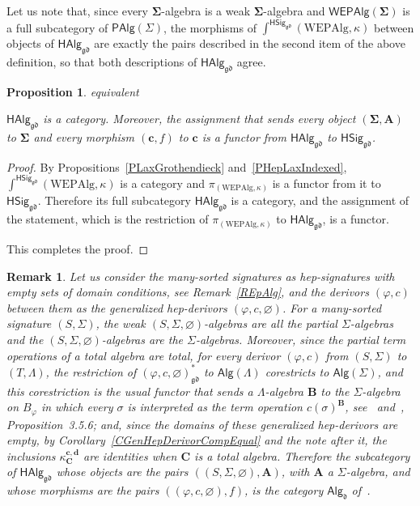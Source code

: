 \documentclass[a4paper, reqno]{amsbook}
\makeatletter
\newcommand{\sig}[1]{\mathbf{#1}}             %
\newcommand{\gd}{\mathfrak{gd}}              %
\theoremstyle{plain}
\newtheorem{proposition}[theorem]{Proposition}
\newtheorem{remark}[theorem]{Remark}
\theoremstyle{definition}
\newcommand*{\CA@leanpending}{}
\newcommand*{\CA@leanrelation}{}
\newcommand*{\lean}[2]{%
  \ifcsname\string\color@lean@#1\endcsname\else
    \PackageError{main}{Unknown relation `#1' in \string\lean}{Use equivalent, weaker or stronger.}%
  \fi
  \gdef\CA@leanrelation{#1}%
  \gdef\CA@leanpending{#2}}
\makeatother
\begin{document}
Let us note that, since every $\sig{\Sigma}$-algebra is a weak $\sig{\Sigma}$-algebra and $\mathsf{WEPAlg}(\sig{\Sigma})$ is a full subcategory of $\mathsf{PAlg}(\Sigma)$, the morphisms of $\int^{\mathsf{HSig}_{\gd}}(\mathrm{WEPAlg},\kappa)$ between objects of $\mathsf{HAlg}_{\gd}$ are exactly the pairs described in the second item of the above definition, so that both descriptions of $\mathsf{HAlg}_{\gd}$ agree.

\begin{proposition}\label{PHepAlgCat}\lean{equivalent}{HepAlgebra.projection}
$\mathsf{HAlg}_{\gd}$ is a category.
Moreover, the assignment that sends every object $(\sig{\Sigma},\mathbf{A})$ to $\sig{\Sigma}$ and every morphism $(\mathbf{c},f)$ to $\mathbf{c}$ is a functor from $\mathsf{HAlg}_{\gd}$ to $\mathsf{HSig}_{\gd}$.
\end{proposition}
\begin{proof}
By Propositions~\ref{PLaxGrothendieck} and~\ref{PHepLaxIndexed}, $\int^{\mathsf{HSig}_{\gd}}(\mathrm{WEPAlg},\kappa)$ is a category and $\pi_{(\mathrm{WEPAlg},\kappa)}$ is a functor from it to $\mathsf{HSig}_{\gd}$.
Therefore its full subcategory $\mathsf{HAlg}_{\gd}$ is a category, and the assignment of the statement, which is the restriction of $\pi_{(\mathrm{WEPAlg},\kappa)}$ to $\mathsf{HAlg}_{\gd}$, is a functor.

This completes the proof.
\end{proof}

\begin{remark}\label{RHepAlgCat}
Let us consider the many-sorted signatures as hep-signatures with empty sets of domain conditions, see Remark~\ref{REpAlg}, and the derivors $(\varphi,c)$ between them as the generalized hep-derivors $(\varphi,c,\varnothing)$.
For a many-sorted signature $(S,\Sigma)$, the weak $(S,\Sigma,\varnothing)$-algebras are all the partial $\Sigma$-algebras and the $(S,\Sigma,\varnothing)$-algebras are the $\Sigma$-algebras.
Moreover, since the partial term operations of a total algebra are total, for every derivor $(\varphi,c)$ from $(S,\Sigma)$ to $(T,\Lambda)$, the restriction of $(\varphi,c,\varnothing)^{\ast}_{\gd}$ to $\mathsf{Alg}(\Lambda)$ corestricts to $\mathsf{Alg}(\Sigma)$, and this corestriction is the usual functor that sends a $\Lambda$-algebra $\mathbf{B}$ to the $\Sigma$-algebra on $B_{\varphi}$ in which every $\sigma$ is interpreted as the term operation $c(\sigma)^{\mathbf{B}}$, see~\cite{ClimentSoliveres2010b} and~\cite{Soliveres2000}, Proposition~3.5.6; and, since the domains of these generalized hep-derivors are empty, by Corollary~\ref{CGenHepDerivorCompEqual} and the note after it, the inclusions $\kappa^{\mathbf{c},\mathbf{d}}_{\mathbf{C}}$ are identities when $\mathbf{C}$ is a total algebra.
Therefore the subcategory of $\mathsf{HAlg}_{\gd}$ whose objects are the pairs $((S,\Sigma,\varnothing),\mathbf{A})$, with $\mathbf{A}$ a $\Sigma$-algebra, and whose morphisms are the pairs $((\varphi,c,\varnothing),f)$, is the category $\mathsf{Alg}_{\mathfrak{d}}$ of~\cite{ClimentSoliveres2010b}.
\end{remark}
\end{document}

